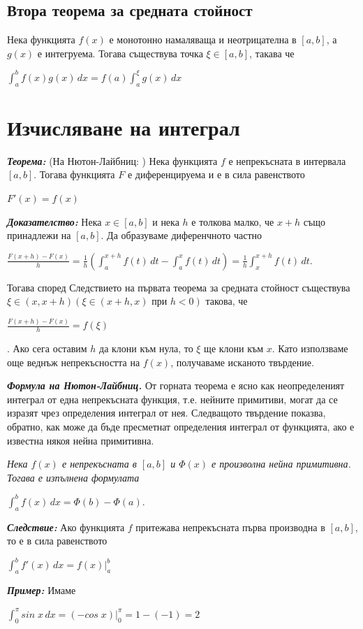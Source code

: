 \documentclass[11pt]{article} %
\newcommand{\italicBold}[1]{\textbf{\emph{#1}}}
\newcommand{\theorem}{\italicBold{Теорема: }}
\newcommand{\proof}{\italicBold{Доказателство: }}
\newcommand{\integral}[4]{\displaystyle \int_{#1}^{#2}#3\,#4}
\begin{document}
\subsection{Втора теорема за средната стойност}
Нека функцията $f(x)$ е монотонно намаляваща и неотрицателна в $[a,b]$, а $g(x)$ е интегруема. Тогава съществува точка $\xi \in [a,b]$, такава че\\
\centerline{$\integral{a}{b}{f(x)g(x)}{dx} = f(a)\integral{a}{\xi}{g(x)}{dx}$}

\section{Изчисляване на интеграл}
\theorem (На Нютон-Лайбниц: ) Нека функцията $f$ е непрекъсната в интервала $[a,b]$. Тогава функцията $F$ е диференцируема и е в сила равенството\\
\centerline{$F'(x)=f(x)$}
\proof Нека $x \in [a,b]$ и нека $h$ е толкова малко, че $x+h$ също принадлежи на $[a,b]$. Да образуваме диференчното частно\\
\centerline{$\displaystyle \frac{F(x+h)-F(x)}{h}=\frac{1}{h}(\integral{a}{x+h}{f(t)}{dt}-\integral{a}{x}{f(t)}{dt})=\frac{1}{h}\integral{x}{x+h}{f(t)}{dt}$.}

Тогава според Следствието на първата теорема за средната стойност съществува $\xi \in (x, x+h)(\xi \in (x+h,x) \text{ при } h<0)$ такова, че \\
\centerline{$\frac{F(x+h)-F(x)}{h}=f(\xi)$}.
Ако сега оставим $h$ да клони към нула, то $\xi$ ще клони към $x$. Като използваме още веднъж непрекъсността на $f(x)$, получаваме исканото твърдение.\\\par

\italicBold{Формула на Нютон-Лайбниц. } От горната теорема е ясно как неопределеният интеграл от една непрекъсната функция, т.е. нейните примитиви, могат да се изразят чрез определения интеграл от нея. Следващото твърдение показва, обратно, как може да бъде пресметнат определения интеграл от функцията, ако е известна някоя нейна примитивна.\par
\textit{Нека $f(x)$ е непрекъсната в $[a,b]$ и $\Phi(x)$ е произволна нейна примитивна. Тогава е изпълнена формулата}\\
\centerline{$\integral{a}{b}{f(x)}{dx} = \Phi(b) - \Phi(a)$.}

\italicBold{Следствие: } Ако функцията $f$ притежава непрекъсната първа производна в $[a,b]$, то е в сила равенството\\
\centerline{$\integral{a}{b}{f'(x)}{dx} = f(x)\Big|_a^b$}

\italicBold{Пример: } Имаме\\
\centerline{$\integral{0}{\pi}{sin\;x}{dx}=(-cos\;x)\big|_0^\pi=1-(-1)=2$} 
  
\end{document}
